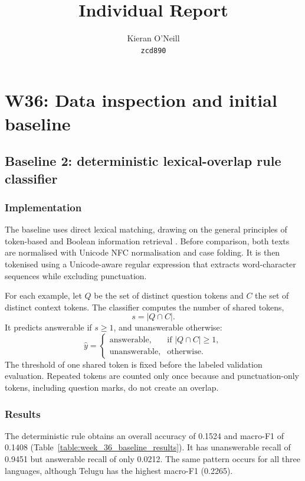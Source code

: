 \documentclass[11pt]{article}
\title{Individual Report}
\author{Kieran O'Neill \\\texttt{zcd890}\\}
\begin{document}
\maketitle

\section{W36: Data inspection and initial baseline}

\subsection{Baseline 2: deterministic lexical-overlap rule classifier}

\subsubsection*{Implementation}

\noindent
The baseline uses direct lexical matching, drawing on the general principles of token-based and Boolean information retrieval \cite{manning2008ir}. Before comparison, both texts are normalised with Unicode NFC normalisation and case folding. It is then tokenised using a Unicode-aware regular expression that extracts word-character sequences while excluding punctuation. 

\noindent 
For each example, let $Q$ be the set of distinct question tokens and $C$ the set of distinct context tokens. The classifier computes the number of shared tokens,
\[
s = |Q \cap C|.
\]
It predicts answerable if $s \geq 1$, and unanswerable otherwise:
\[
    \hat{y} =
        \begin{cases}
            \text{answerable}, & \text{if } |Q \cap C| \geq 1, \\
            \text{unanswerable}, & \text{otherwise.}
        \end{cases}
\]
The threshold of one shared token is fixed before the labeled validation evaluation. Repeated tokens are counted only once because and punctuation-only tokens, including question marks, do not create an overlap.

\subsubsection*{Results}

\noindent
The deterministic rule obtains an overall accuracy of 0.1524 and macro-F1 of 0.1408 (Table~\ref{table:week_36_baseline_results}). It has unanswerable recall of 0.9451 but answerable recall of only 0.0212. The same pattern occurs for all three languages, although Telugu has the highest macro-F1 (0.2265).
\end{document}
